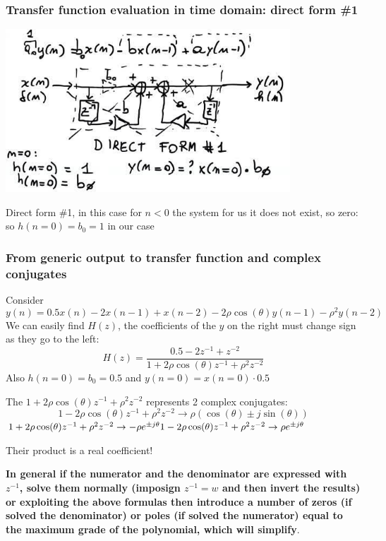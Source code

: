 \subsubsection{Transfer function evaluation in time domain: direct form \#1}
\begin{center}
    \includegraphics[width=0.8\textwidth]{images/Screenshot from 2022-10-07 16-24-14.png}
\end{center}
Direct form \#1, in this case for $n<0$ the system for us it does not exist, so zero: so $h(n=0)=b_0=1$ in our case

\subsubsection{From generic output to transfer function and complex conjugates}
Consider
$$
y(n)=0.5x(n)-2x(n-1)+x(n-2)-2\rho\cos(\theta)y(n-1)-\rho^2y(n-2)
$$
We can easily find $H(z)$, the coefficients of the $y$ on the right must change sign as they go to the left:
$$
H(z)=\frac{
    0.5-2z^{-1}+z^{-2}
}{
    1+2\rho\cos(\theta)z^{-1}+\rho^2z^{-2}
}
$$
Also $h(n=0)=b_0=0.5$ and $y(n=0)=x(n=0)\cdot 0.5$

The $1+2\rho\cos(\theta)z^{-1}+\rho^2z^{-2}$ represents 2 complex conjugates:
$$
1-2\rho\cos(\theta)z^{-1}+\rho^2z^{-2}\rightarrow \rho(\cos(\theta)\pm j\sin(\theta))
$$
$
1+2\rho\cos(\theta)z^{-1}+\rho^2z^{-2}\rightarrow -\rho e^{\pm j\theta}
\\
1-2\rho\cos(\theta)z^{-1}+\rho^2z^{-2}\rightarrow \rho e^{\pm j\theta}
$

Their product is a real coefficient!

\textbf{In general if the numerator and the denominator are expressed with $z^{-1}$, solve them normally (imposign $z^{-1}=w$ and then invert the results) or exploiting the above formulas then introduce a number of zeros (if solved the denominator) or poles (if solved the numerator) equal to the maximum grade of the polynomial, which will simplify}.

